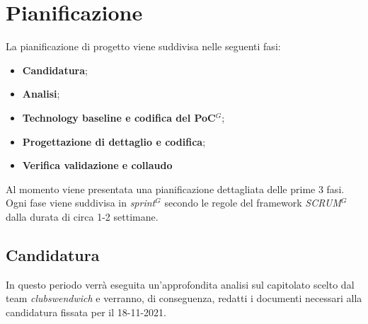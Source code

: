 \section{Pianificazione}
La pianificazione di progetto viene suddivisa nelle seguenti fasi:
\begin{itemize}
    \item \textbf{Candidatura};
    \item \textbf{Analisi};
    \item \textbf{Technology baseline e codifica del PoC$^{G}$};
    \item \textbf{Progettazione di dettaglio e codifica};
    \item \textbf{Verifica validazione e collaudo}
\end{itemize} 
Al momento viene presentata una pianificazione dettagliata delle prime 3 fasi. Ogni fase viene suddivisa in \textit{sprint}$^{G}$ secondo le regole
del framework \textit{SCRUM}$^{G}$ dalla durata di circa 1-2 settimane. 
\subsection{Candidatura}
In questo periodo verrà eseguita un'approfondita analisi sul capitolato scelto dal team \textit{clubswendwich} e verranno, di conseguenza, redatti i documenti necessari alla candidatura fissata per il 18-11-2021.

